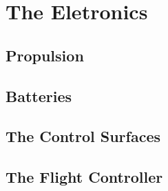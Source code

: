 
\chapter{The Eletronics} \label{chap:conc}
	
\section{Propulsion}

\section{Batteries}

\section{The Control Surfaces}

\section{The Flight Controller}


